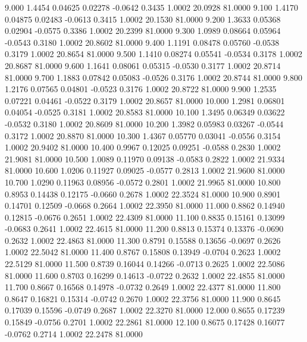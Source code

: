    9.000   1.4454   0.04625   0.02278  -0.0642   0.3435   1.0002  20.0928  81.0000
   9.100   1.4170   0.04875   0.02483  -0.0613   0.3415   1.0002  20.1530  81.0000
   9.200   1.3633   0.05368   0.02904  -0.0575   0.3386   1.0002  20.2399  81.0000
   9.300   1.0989   0.08664   0.05964  -0.0543   0.3180   1.0002  20.8602  81.0000
   9.400   1.1191   0.08478   0.05760  -0.0538   0.3179   1.0002  20.8654  81.0000
   9.500   1.1410   0.08274   0.05541  -0.0534   0.3178   1.0002  20.8687  81.0000
   9.600   1.1641   0.08061   0.05315  -0.0530   0.3177   1.0002  20.8714  81.0000
   9.700   1.1883   0.07842   0.05083  -0.0526   0.3176   1.0002  20.8744  81.0000
   9.800   1.2176   0.07565   0.04801  -0.0523   0.3176   1.0002  20.8722  81.0000
   9.900   1.2535   0.07221   0.04461  -0.0522   0.3179   1.0002  20.8657  81.0000
  10.000   1.2981   0.06801   0.04054  -0.0525   0.3181   1.0002  20.8583  81.0000
  10.100   1.3495   0.06349   0.03622  -0.0532   0.3180   1.0002  20.8609  81.0000
  10.200   1.3982   0.05983   0.03267  -0.0544   0.3172   1.0002  20.8870  81.0000
  10.300   1.4367   0.05770   0.03041  -0.0556   0.3154   1.0002  20.9402  81.0000
  10.400   0.9967   0.12025   0.09251  -0.0588   0.2830   1.0002  21.9081  81.0000
  10.500   1.0089   0.11970   0.09138  -0.0583   0.2822   1.0002  21.9334  81.0000
  10.600   1.0206   0.11927   0.09025  -0.0577   0.2813   1.0002  21.9600  81.0000
  10.700   1.0290   0.11963   0.08956  -0.0572   0.2801   1.0002  21.9965  81.0000
  10.800   0.8953   0.14438   0.12175  -0.0660   0.2678   1.0002  22.3524  81.0000
  10.900   0.8901   0.14701   0.12509  -0.0668   0.2664   1.0002  22.3950  81.0000
  11.000   0.8862   0.14940   0.12815  -0.0676   0.2651   1.0002  22.4309  81.0000
  11.100   0.8835   0.15161   0.13099  -0.0683   0.2641   1.0002  22.4615  81.0000
  11.200   0.8813   0.15374   0.13376  -0.0690   0.2632   1.0002  22.4863  81.0000
  11.300   0.8791   0.15588   0.13656  -0.0697   0.2626   1.0002  22.5042  81.0000
  11.400   0.8767   0.15808   0.13949  -0.0704   0.2623   1.0002  22.5129  81.0000
  11.500   0.8739   0.16044   0.14266  -0.0713   0.2625   1.0002  22.5086  81.0000
  11.600   0.8703   0.16299   0.14613  -0.0722   0.2632   1.0002  22.4855  81.0000
  11.700   0.8667   0.16568   0.14978  -0.0732   0.2649   1.0002  22.4377  81.0000
  11.800   0.8647   0.16821   0.15314  -0.0742   0.2670   1.0002  22.3756  81.0000
  11.900   0.8645   0.17039   0.15596  -0.0749   0.2687   1.0002  22.3270  81.0000
  12.000   0.8655   0.17239   0.15849  -0.0756   0.2701   1.0002  22.2861  81.0000
  12.100   0.8675   0.17428   0.16077  -0.0762   0.2714   1.0002  22.2478  81.0000
